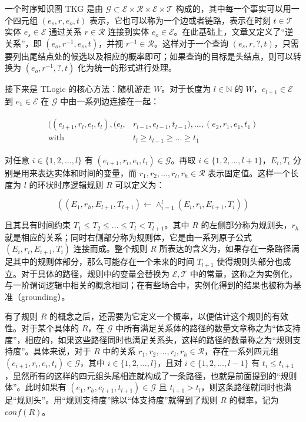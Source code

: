 \documentclass[a4paper, AutoFakeBold]{article}
\begin{document}
一个时序知识图 TKG 是由 ${\mathcal G}\subset{\mathcal E}\times{\mathcal R}\times{\mathcal E}\times{\mathcal T}$ 构成的，其中每一个事实可以用一个四元组 $(e_s,r,e_o,t)$ 表示，它也可以称为一个边或者链路，表示在时刻 $t\in{\mathcal T}$ 实体 $e_s\in{\mathcal E}$ 通过关系 $r\in{\mathcal R}$ 连接到实体 $e_o\in{\mathcal E}$。在此基础上，文章又定义了“逆关系”，即 $(e_o,r^{-1},e_s,t)$，并视 $r^{-1}\in{\mathcal R}$。这样对于一个查询 $(e_s,r,?,t)$，只需要列出尾结点处的候选以及相应的概率即可；如果查询的目标是头结点，则可以转换为 $(e_o,r^{-1},?,t)$ 化为统一的形式进行处理。

接下来是 TLogic 的核心方法：随机游走 $W$。对于长度为 $l\in{\mathbb N}$ 的 $W$，$e_{l+1}\in{\mathcal E}$ 到 $e_1\in{\mathcal E}$ 在 ${\mathcal G}$ 中由一系列边连接在一起：

\begin{equation}
	\begin{aligned}
		\begin{split}
			((e_{l+1},r_l,e_l,t_l),(e_l, & r_{l-1}, e_{l-1}, t_{l-1}),\dots,(e_2, r_1, e_1, t_1)\\ 
			\text{with}\ & t_l\ge t_{l-1}\ge \dots\ge t_1
		\end{split}
	\end{aligned}
\end{equation}

对任意 $i\in\{1,2,\dots,l\}$ 有 $(e_{i+1},r_i,e_i,t_i)\in{\mathcal G}$。再取 $i\in\{1,2,\dots,l+1\}$，$E_i, T_i$ 分别是用来表达实体和时间的变量，而 $r_1, r_2,\dots,r_l,r_h\in{\mathcal R}$ 表示固定值。这样一个长度为 $l$ 的环状时序逻辑规则 $R$ 可以定义为：

\begin{equation}
	((E_1, r_h, E_{l+1}, T_{l+1})\leftarrow\wedge_{i=1}^l(E_i, r_i, E_{i+1}, T_i))
\end{equation}

且其具有时间约束 $T_1\le T_2\le\dots\le T_l< T_{l+1}$。其中 $R$ 的左侧部分称为规则头，$r_h$ 就是相应的关系；同时右侧部分称为规则体，它是由一系列原子公式 $(E_i,r_i,E_{i+1},T_i)$ 连接而成。整个规则 $R$ 所表达的含义为，如果存在一条路径满足其中的规则体部分，那么可能存在一个未来的时间 $T_{l+1}$ 使得规则头部分也成立。对于具体的路径，规则中的变量会替换为 ${\mathcal E},{\mathcal T}$ 中的常量，这称之为实例化，与一阶谓词逻辑中相关的概念相同；在有些场合中，实例化得到的结果也被称为基准（grounding）。

有了规则 $R$ 的概念之后，还需要为它定义一个概率，以便估计这个规则的有效性。对于某个具体的 $R$，在 ${\mathcal G}$ 中所有满足关系体的路径的数量文章称之为“体支持度”，相应的，如果这些路径同时也满足关系头，这样的路径的数量称之为“规则支持度”。具体来说，对于 $R$ 中的关系 $r_1, r_2,\dots,r_l,r_h\in{\mathcal R}$，存在一系列四元组 $(e_{i+1},r_i,e_i,t_i)\in{\mathcal G}$，其中 $i\in\{1,2,\dots,l\}$，且对 $i\in\{1,2,\dots,l-1\}$ 有 $t_i\le t_{i+1}$，显然所有的这样的四元组头尾相连就构成了一条路径，也就是前面提到的“规则体”。此时如果有 $(e_1,r_h,e_{l+1},t_{l+1})\in{\mathcal G}$ 且 $t_{l+1}>t_l$，则这条路径就同时也满足“规则头”。用“规则支持度”除以“体支持度”就得到了规则 $R$ 的概率，记为 $conf(R)$。
\end{document}
